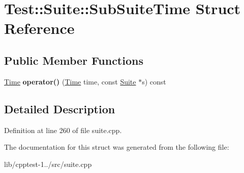 \hypertarget{struct_test_1_1_suite_1_1_sub_suite_time}{}\section{Test\+:\+:Suite\+:\+:Sub\+Suite\+Time Struct Reference}
\label{struct_test_1_1_suite_1_1_sub_suite_time}
\subsection*{Public Member Functions}
\begin{DoxyCompactItemize}
\item 
\hyperlink{class_test_1_1_time}{Time} {\bfseries operator()} (\hyperlink{class_test_1_1_time}{Time} time, const \hyperlink{class_test_1_1_suite}{Suite} $\ast$s) const \hypertarget{struct_test_1_1_suite_1_1_sub_suite_time_ac2b37f6d1e04cbc7d94bbbe2de73bf33}{}\label{struct_test_1_1_suite_1_1_sub_suite_time_ac2b37f6d1e04cbc7d94bbbe2de73bf33}

\end{DoxyCompactItemize}


\subsection{Detailed Description}


Definition at line 260 of file suite.\+cpp.



The documentation for this struct was generated from the following file\+:\begin{DoxyCompactItemize}
\item 
lib/cpptest-\/1../src/suite.\+cpp\end{DoxyCompactItemize}
